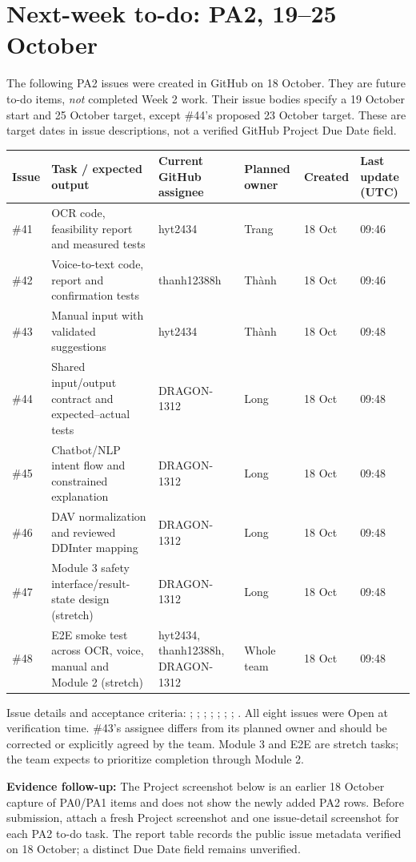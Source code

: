 \section{Next-week to-do: PA2, 19--25 October}
The following PA2 issues were created in GitHub on 18 October. They are future to-do items, \emph{not} completed Week 2 work. Their issue bodies specify a 19 October start and 25 October target, except \#44's proposed 23 October target. These are target dates in issue descriptions, not a verified GitHub Project Due Date field.
\small
\begin{longtable}{p{0.8cm}p{4.9cm}p{2.4cm}p{2.2cm}p{1.4cm}p{1.7cm}}
\toprule Issue & Task / expected output & Current GitHub assignee & Planned owner & Created & Last update (UTC) \\ \midrule
\#41 & OCR code, feasibility report and measured tests & hyt2434 & Trang & 18 Oct & 09:46 \\
\#42 & Voice-to-text code, report and confirmation tests & thanh12388h & Thành & 18 Oct & 09:46 \\
\#43 & Manual input with validated suggestions & hyt2434 & Thành & 18 Oct & 09:48 \\
\#44 & Shared input/output contract and expected--actual tests & DRAGON-1312 & Long & 18 Oct & 09:48 \\
\#45 & Chatbot/NLP intent flow and constrained explanation & DRAGON-1312 & Long & 18 Oct & 09:48 \\
\#46 & DAV normalization and reviewed DDInter mapping & DRAGON-1312 & Long & 18 Oct & 09:48 \\
\#47 & Module 3 safety interface/result-state design (stretch) & DRAGON-1312 & Long & 18 Oct & 09:48 \\
\#48 & E2E smoke test across OCR, voice, manual and Module 2 (stretch) & hyt2434, thanh12388h, DRAGON-1312 & Whole team & 18 Oct & 09:48 \\ \bottomrule
\end{longtable}
\normalsize
Issue details and acceptance criteria: ; ; ; ; ; ; ; . All eight issues were Open at verification time. \#43's assignee differs from its planned owner and should be corrected or explicitly agreed by the team. Module 3 and E2E are stretch tasks; the team expects to prioritize completion through Module 2.

\textbf{Evidence follow-up:} The Project screenshot below is an earlier 18 October capture of PA0/PA1 items and does not show the newly added PA2 rows. Before submission, attach a fresh Project screenshot and one issue-detail screenshot for each PA2 to-do task. The report table records the public issue metadata verified on 18 October; a distinct Due Date field remains unverified.

